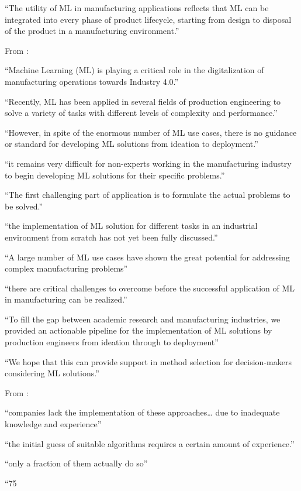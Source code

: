 “The utility of ML in manufacturing applications reflects that ML can be integrated into every phase of product lifecycle, starting from design to disposal of the product in a manufacturing environment.”


From \parencite{chen2023ml_manufacturing_industry4} :

“Machine Learning (ML) is playing a critical role in the digitalization of manufacturing operations towards Industry 4.0.”

“Recently, ML has been applied in several fields of production engineering to solve a variety of tasks with different levels of complexity and performance.”

“However, in spite of the enormous number of ML use cases, there is no guidance or standard for developing ML solutions from ideation to deployment.”

“it remains very difficult for non-experts working in the manufacturing industry to begin developing ML solutions for their specific problems.”

“The first challenging part of application is to formulate the actual problems to be solved.”

“the implementation of ML solution for different tasks in an industrial environment from scratch has not yet been fully discussed.”

“A large number of ML use cases have shown the great potential for addressing complex manufacturing problems”

“there are critical challenges to overcome before the successful application of ML in manufacturing can be realized.”

“To fill the gap between academic research and manufacturing industries, we provided an actionable pipeline for the implementation of ML solutions by production engineers from ideation through to deployment”

“We hope that this can provide support in method selection for decision-makers considering ML solutions.”


From \parencite{sonntag2023pattern_ml_product_development} :

“companies lack the implementation of these approaches… due to inadequate knowledge and experience”

“the initial guess of suitable algorithms requires a certain amount of experience.”

“only a fraction of them actually do so”

“75%

